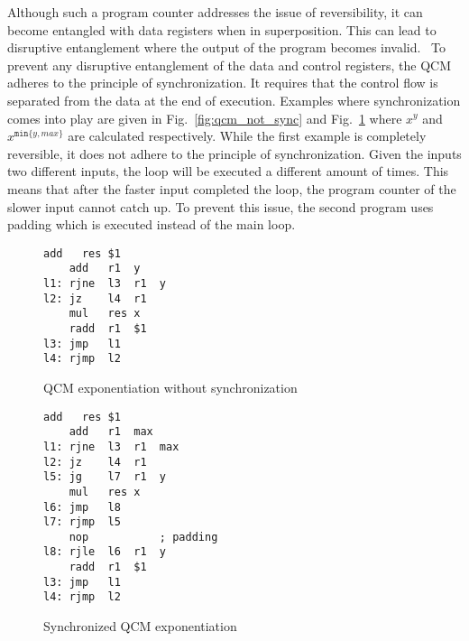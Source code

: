 Although such a program counter addresses the issue of reversibility, it can become entangled with data registers when in superposition. This can lead to disruptive entanglement where the output of the program becomes invalid.~\cite{YVC24} To prevent any disruptive entanglement of the data and control registers, the QCM adheres to the principle of synchronization. 
It requires that the control flow is separated from the data at the end of execution. 
Examples where synchronization comes into play are given in Fig.~\ref{fig:qcm_not_sync} and Fig.~\ref{fig:qcm_sync} where $x^y$ and $x^{\texttt{min}\{y, max\}}$ are calculated respectively. 
While the first example is completely reversible, it does not adhere to the principle of synchronization. Given the inputs two different inputs, the loop will be executed a different amount of times. This means that after the faster input completed the loop, the program counter of the slower input cannot catch up. To prevent this issue, the second program uses padding which is executed instead of the main loop. 
\begin{figure}
    \centering     
    \begin{minipage}{.40\textwidth}
        \vspace{7.5em}
        \begin{lstlisting}[linewidth=17em,style=QCM]
    add   res $1
    add   r1  y
l1: rjne  l3  r1  y
l2: jz    l4  r1
    mul   res x
    radd  r1  $1
l3: jmp   l1  
l4: rjmp  l2      
        \end{lstlisting}
        \caption{QCM exponentiation without synchronization}
        \label{fig:qcm_not_sync}
    \end{minipage}
    \hfill
    \begin{minipage}{.55\textwidth}
        \begin{lstlisting}[linewidth=23em,style=QCM]
    add   res $1
    add   r1  max
l1: rjne  l3  r1  max
l2: jz    l4  r1
l5: jg    l7  r1  y   
    mul   res x
l6: jmp   l8  
l7: rjmp  l5
    nop           ; padding
l8: rjle  l6  r1  y
    radd  r1  $1
l3: jmp   l1
l4: rjmp  l2
        \end{lstlisting}
        \caption{Synchronized QCM exponentiation}    
        \label{fig:qcm_sync}
    \end{minipage}
\end{figure}



